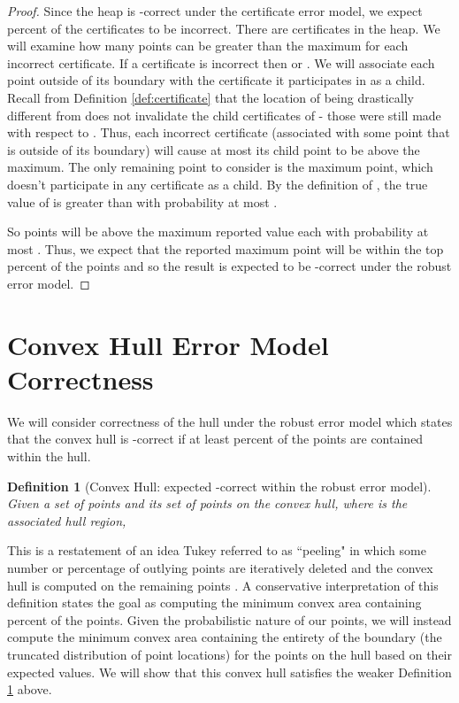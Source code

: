 \documentclass[11pt]{article}
\newtheorem{definition}[theorem]{Definition}
\begin{document}
\begin{proof}
Since the heap is -correct under the certificate error model, we expect  percent of the certificates to be incorrect.  There are  
certificates in the heap.  We will examine how many points can be greater than the maximum for each incorrect certificate.  If a certificate  is incorrect then  or .  We will associate each point outside of its boundary with the certificate it participates in as a child.  Recall from Definition \ref{def:certificate} that the location of  being drastically different from  does not invalidate the child certificates of  - those were still made with respect to .   
  Thus, each incorrect certificate (associated with some point that is outside of its boundary) will cause at most its child point to be above the maximum.  The only remaining point to consider is the maximum point, which doesn't participate in any certificate as a child.  By the definition of , the true value
  of  is greater than  with probability at most .
      
  So  points will be above the maximum reported value each with probability at most .  Thus, we expect that the reported
  maximum point will be within the top  percent of the
  points and so the result is expected to be -correct under the
  robust error model.
\end{proof}



\section{Convex Hull Error Model Correctness}
\label{convex_hull_proof}
We will consider correctness of the hull under the robust error model which states that the convex hull is -correct if at least  percent of the points are contained within the hull.  

\begin{definition}[Convex Hull: expected -correct within the robust error model]
Given a set of  points  and its set of points  on the convex hull, where  is the associated hull region,

\label{def:robust_convex}
\end{definition}

\noindent This is a restatement of an idea Tukey referred to as ``peeling" in which some number or percentage of outlying points are iteratively deleted and the convex hull is computed on the remaining points \cite{Huber72Robust}.  A conservative interpretation of this definition states the goal as computing the minimum convex area containing  percent of the points.  Given the probabilistic nature of our points, we will instead compute the minimum convex area containing the entirety of the boundary (the truncated distribution of point locations) for the points on the hull based on their expected values.  We will show that this convex hull satisfies the weaker Definition \ref{def:robust_convex} above.
\end{document}

